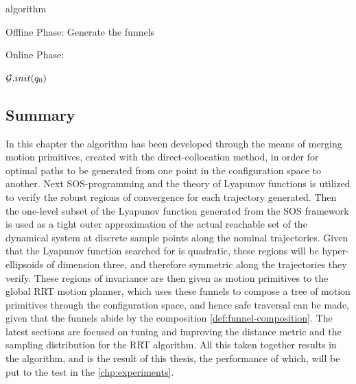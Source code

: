 \begin{algorithm}
  \caption{\rrtfunnel{} algorithm}
  \label{alg:rrtfunnel}
  \DontPrintSemicolon

   

   

  Offline Phase: Generate the funnels

  Online Phase:

  \TestUncertainFunnels{} \; \BuildComposabilityMatrix{}

  \(\mathcal{G}.\mathnormal{init}(q_0)\) 
\end{algorithm}


\subsection{Summary}

In this chapter the \rrtfunnel{} algorithm has been developed through the means
of merging motion primitives, created with the direct-collocation method, in
order for optimal paths to be generated from one point in the configuration
space to another. Next \ac{SOS}-programming and the theory of Lyapunov functions
is utilized to verify the robust regions of convergence for each trajectory
generated. Then the one-level subset of the Lyapunov function generated from the
\ac{SOS} framework is used as a tight outer approximation of the actual
reachable set of the dynamical system at discrete sample points along the
nominal trajectories. Given that the Lyapunov function searched for is
quadratic, these regions will be hyper-ellipsoids of dimension three, and
therefore symmetric along the trajectories they verify. These regions of
invariance are then given as motion primitives to the global \ac{RRT} motion
planner, which uses these funnels to compose a tree of motion primitives through
the configuration space, and hence safe traversal can be made, given that the
funnels abide by the composition \cref{def:funnel-composition}. The latest
sections are focused on tuning and improving the distance metric and the
sampling distribution for the \ac{RRT} algorithm. All this taken together
results in the \rrtfunnel{} algorithm, and is the result of this thesis, the
performance of which, will be put to the test in the \cref{chp:experiments}.
